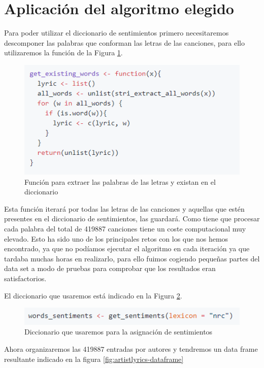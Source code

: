\section{Aplicación del algoritmo elegido}

Para poder utilizar el diccionario de sentimientos primero necesitaremos descomponer las palabras que conforman las letras de las canciones, para ello utilizaremos la función de la Figura \ref{fig:get_existing_words}. 

\begin{figure}[h]
	\centering
	\includegraphics[width=0.7\linewidth]{Imagenes/get_existing_words}
	\caption{Función para extraer las palabras de las letras y existan en el diccionario }
	\label{fig:get_existing_words}
\end{figure}

Esta función iterará por todas las letras de las canciones y aquellas que estén presentes en el diccionario de sentimientos, las guardará. Como tiene que procesar cada palabra del total de 419887 canciones tiene un coste computacional muy elevado. Esto ha sido uno de los principales retos con los que nos hemos encontrado, ya que no podíamos ejecutar el algoritmo en cada iteración ya que tardaba muchas horas en realizarlo, para ello fuimos cogiendo pequeñas partes del data set a modo de pruebas para comprobar que los resultados eran satisfactorios.

El diccionario que usaremos está indicado en la Figura \ref{fig:word_sentiments}.


\begin{figure}[h]
	\centering
	\includegraphics[width=0.7\linewidth]{Imagenes/word_sentiments}
	\caption{Diccionario que usaremos para la asignación de sentimientos}
	\label{fig:word_sentiments}
\end{figure}

 Ahora organizaremos las 419887 entradas por autores y tendremos un data frame resultante indicado en la figura \ref{fig:artistlyrics-dataframe}

